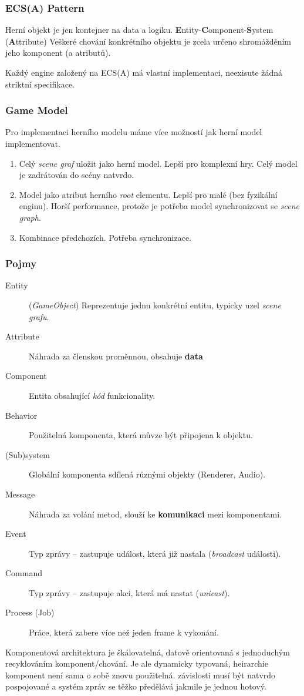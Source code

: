 \subsubsection*{ECS(A) Pattern}

Herní objekt je jen kontejner na data a logiku.
\textbf{E}ntity-\textbf{C}omponent-\textbf{S}ystem (\textbf{A}ttribute)
Veškeré chování konkrétního objektu je zcela určeno shromážděním jeho komponent (a atributů).


Každý engine založený na ECS(A) má vlastní implementaci, neexisute žádná striktní specifikace.


\subsubsection*{Game Model}

Pro implementaci herního modelu máme více možností jak herní model implementovat.

\begin{enumerate}
    \item Celý \textit{scene graf} uložit jako herní model. Lepší pro komplexní hry. Celý model je zadrátován do scény natvrdo.
    \item Model jako atribut herního \textit{root} elementu. Lepší pro malé (bez fyzikální enginu). Horší performance, protože je potřeba model synchronizovat se \textit{scene graph}.
    \item Kombinace předchozích. Potřeba synchronizace.
\end{enumerate}

\subsubsection*{Pojmy}

\begin{description}
    \item[Entity] (\textit{GameObject}) Reprezentuje jednu konkrétní entitu, typicky uzel \textit{scene grafu}.
    \item[Attribute] Náhrada za členskou proměnnou, obsahuje \textbf{data}
    \item[Component] Entita obsahující \textit{kód} funkcionality. 
    \item[Behavior] Použitelná komponenta, která můvze být připojena k objektu.
    \item[(Sub)system] Globální komponenta sdílená různými objekty (Renderer, Audio).
    \item[Message] Náhrada za volání metod, slouží ke \textbf{komunikaci} mezi komponentami.
    \item[Event] Typ zprávy -- zastupuje událost, která již nastala (\textit{broadcast} události).
    \item[Command] Typ zprávy -- zastupuje akci, která má nastat (\textit{unicast}).
    \item[Process (Job)] Práce, která zabere více než jeden frame k vykonání.
\end{description}

Komponentová architektura je škálovatelná, datově orientovaná s jednoduchým recyklováním komponent/chování.
Je ale dynamicky typovaná, heirarchie komponent není sama o sobě znovu použitelná. závislosti musí být natvrdo pospojované a systém zpráv se těžko předělává jakmile je jednou hotový.
